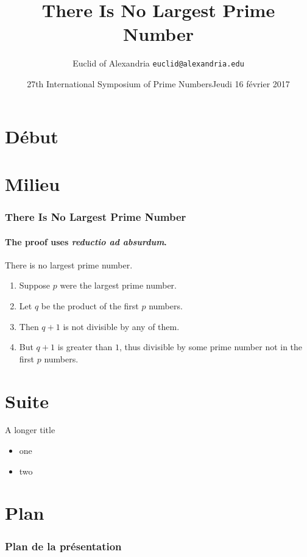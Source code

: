 \documentclass{beamer}
\title{There Is No Largest Prime Number}
\date[ISPN ’80]{27th International Symposium of Prime Numbers}
\author[Euclid]{Euclid of Alexandria \texttt{euclid@alexandria.edu}}
\date{Jeudi 16 février 2017}
\begin{document}
\section{Début}
\begin{frame}[plain]
\titlepage
\end{frame}

\section{Milieu}

\begin{frame} 
	\frametitle{There Is No Largest Prime Number} 
	\framesubtitle{The proof uses \textit{reductio ad absurdum}.} 
	
	\begin{theorem}
		There is no largest prime number. 
	\end{theorem} 
	
	\begin{enumerate} 
		\item<1-| alert@1> Suppose $p$ were the largest prime number. 
		\item<2-> Let $q$ be the product of the first $p$ numbers. 
		\item<3-> Then $q+1$ is not divisible by any of them. 
		\item<1-> But $q + 1$ is greater than $1$, thus divisible by some prime
			number not in the first $p$ numbers.
	\end{enumerate}
\end{frame}

\section{Suite}
\begin{frame}{A longer title}
	\begin{itemize}
		\item one
		\item two
	\end{itemize}
\end{frame}

\section{Plan}
\begin{frame}
	\frametitle{Plan de la présentation}
	\insertverticalnavigation{3cm}
\end{frame}
\end{document}
